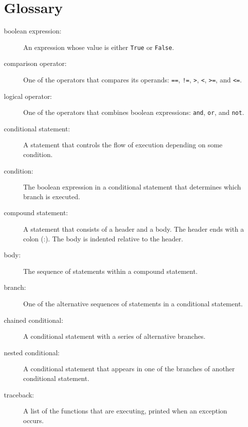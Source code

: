 \documentclass[10pt]{book}
\begin{document}
\section{Glossary}

\begin{description}

\item[boolean expression:]  An expression whose value is either 
{\tt True} or {\tt False}.

\item[comparison operator:] One of the operators that compares
its operands: {\tt ==}, {\tt !=}, {\tt >}, {\tt <}, {\tt >=}, and {\tt <=}.

\item[logical operator:] One of the operators that combines boolean
expressions: {\tt and}, {\tt or}, and {\tt not}.

\item[conditional statement:]  A statement that controls the flow of
execution depending on some condition.

\item[condition:] The boolean expression in a conditional statement
that determines which branch is executed.

\item[compound statement:]  A statement that consists of a header
and a body.  The header ends with a colon (:).  The body is indented
relative to the header.

\item[body:] The sequence of statements within a compound statement.

\item[branch:] One of the alternative sequences of statements in
a conditional statement.

\item[chained conditional:]  A conditional statement with a series
of alternative branches.

\item[nested conditional:]  A conditional statement that appears
in one of the branches of another conditional statement.

\item[traceback:]  A list of the functions that are executing,
printed when an exception occurs.


\end{description}
\end{document}
